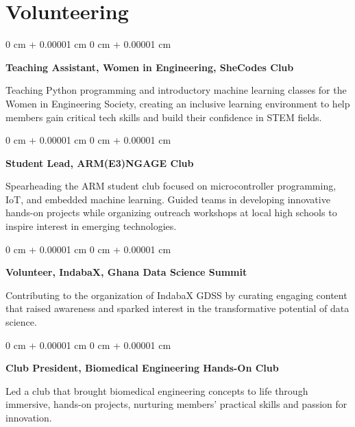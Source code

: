 \documentclass[10pt, letterpaper]{article}
\newenvironment{onecolentry}{
    \begin{adjustwidth}{
        0 cm + 0.00001 cm
    }{
        0 cm + 0.00001 cm
    }
}{
    \end{adjustwidth}
} %
\begin{document}
    \section{Volunteering}

    \begin{onecolentry}
        \textbf{Teaching Assistant, Women in Engineering, SheCodes Club}
        
        Teaching Python programming and introductory machine learning classes for the Women in Engineering Society, creating an inclusive learning environment to help members gain critical tech skills and build their confidence in STEM fields.
    \end{onecolentry}

    \vspace{0.2 cm}

    \begin{onecolentry}
        \textbf{Student Lead, ARM(E3)NGAGE Club}
        
        Spearheading the ARM student club focused on microcontroller programming, IoT, and embedded machine learning. Guided teams in developing innovative hands-on projects while organizing outreach workshops at local high schools to inspire interest in emerging technologies.
    \end{onecolentry}

    \vspace{0.2 cm}

    \begin{onecolentry}
        \textbf{Volunteer, IndabaX, Ghana Data Science Summit}
        
        Contributing to the organization of IndabaX GDSS by curating engaging content that raised awareness and sparked interest in the transformative potential of data science.
    \end{onecolentry}

    \vspace{0.2 cm}

    \begin{onecolentry}
        \textbf{Club President, Biomedical Engineering Hands-On Club}
        
        Led a club that brought biomedical engineering concepts to life through immersive, hands-on projects, nurturing members' practical skills and passion for innovation.
    \end{onecolentry}

    \vspace{0.2 cm}
\end{document}
